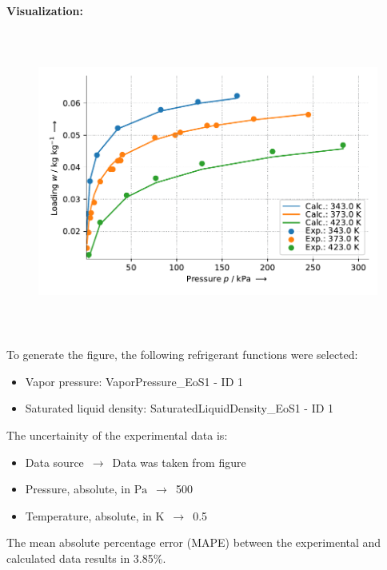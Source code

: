 \textbf{Visualization:}
%
\begin{figure}[!htp]
{\noindent\includegraphics[height=10cm, keepaspectratio]{figs/ads/ads_Propylene_carbon_molecular_sieve_4A_Toth_1.pdf}}
\end{figure}
%

To generate the figure, the following refrigerant functions were selected:
\begin{itemize}
\item Vapor pressure: VaporPressure\_EoS1 - ID 1
\item Saturated liquid density: SaturatedLiquidDensity\_EoS1 - ID 1
\end{itemize}

The uncertainity of the experimental data is:
\begin{itemize}
\item Data source $\,\to\,$ Data was taken from figure
\item Pressure, absolute, in $\si{\pascal}$ $\,\to\,$ 500
\item Temperature, absolute, in $\si{\kelvin}$ $\,\to\,$ 0.5
\end{itemize}

The mean absolute percentage error (MAPE) between the experimental and calculated data results in 3.85\%.
\FloatBarrier
\newpage
